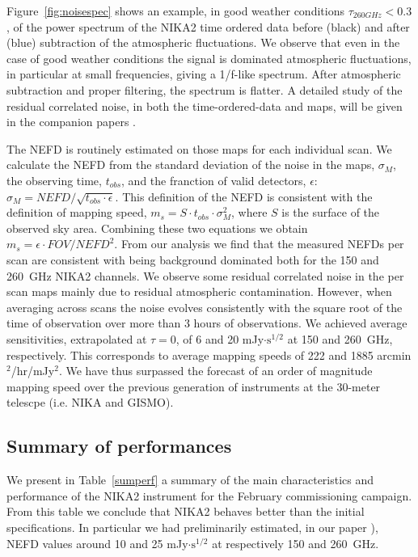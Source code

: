 \documentclass[]{aa} %
\begin{document}
Figure~\ref{fig:noisespec} shows an example, in good weather conditions $\tau_{260 GHz} < 0.3$, of the power spectrum of the NIKA2 time ordered data before (black) and after (blue) subtraction of the atmospheric fluctuations.
We observe that even in the case of good weather conditions the signal is dominated atmospheric fluctuations, in particular at small frequencies, giving a 1/f-like spectrum. After atmospheric subtraction and proper filtering, the spectrum is flatter. A detailed study of the residual correlated noise, in both the time-ordered-data and maps, will be given in the companion papers \cite{commissioning,pipeline}.

The NEFD is routinely estimated on those maps for each individual scan. We calculate the NEFD from the standard deviation of the noise in the maps, $\sigma_{M}$, the observing time, $t_{obs}$, and the franction of valid detectors, $\epsilon$: $\sigma_{M} = NEFD / \sqrt{t_{obs} \cdot \epsilon}$. This definition of the NEFD is consistent with the definition of mapping speed, $m_{s} = S \cdot t_{obs} \cdot \sigma_{M}^{2}$, where $S$ is the surface of the observed sky area. Combining these two equations we obtain 
$m_{s} = \epsilon \cdot FOV / NEFD^2$.
From our analysis we find that the measured NEFDs per scan are consistent with being background dominated both for the 150 and 260~GHz NIKA2 channels. We observe some residual correlated noise in the per scan maps mainly due to residual atmospheric contamination. However, when averaging across scans the noise evolves consistently with the square root of the time of observation over more than 3 hours of observations. We achieved average sensitivities, extrapolated at $\tau = 0$,  
of 6 and 20 mJy$\cdot\textrm{s}^{1/2}$ at 150 and 260~GHz, respectively. This corresponds to average mapping speeds of 222 and 1885 arcmin$^2$/hr/mJy$^2$.
We have thus surpassed the forecast of an order of magnitude mapping speed over the previous generation of instruments at the 30-meter telescpe (i.e. NIKA and GISMO).

\subsection{Summary of performances}
We present in Table~\ref{sumperf} a summary of the main characteristics and performance of the NIKA2 instrument for the February commissioning campaign. From this table we conclude that NIKA2 behaves better than the initial specifications. In particular we had preliminarily estimated, in our paper \cite{Calvo2016}), NEFD values around 10 and 25 mJy$\cdot\textrm{s}^{1/2}$ at respectively 150 and 260~GHz.
\end{document}
